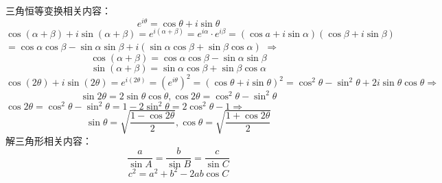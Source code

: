 三角恒等变换相关内容：
\begin{equation}
{e^{i\theta }} = \cos \theta  + i\sin \theta 
\end{equation}
$
\cos \left( {\alpha  + \beta } \right) + i\sin \left( {\alpha  + \beta } \right) = {e^{i\left( {\alpha  + \beta } \right)}} = {e^{i\alpha }} \cdot {e^{i\beta }} = \left( {\cos a + i\sin \alpha } \right)\left( {\cos \beta  + i\sin \beta } \right)
$
$= \cos \alpha \cos \beta  - \sin \alpha \sin \beta  + i\left( {\sin \alpha \cos \beta  + \sin \beta \cos \alpha } \right)
$
$\Rightarrow$
\begin{equation}
\cos \left( {\alpha  + \beta } \right) = \cos \alpha \cos \beta  - \sin \alpha \sin \beta
\end{equation}
\begin{equation}
\sin \left( {\alpha  + \beta } \right) = \sin \alpha \cos \beta  + \sin \beta \cos \alpha
\end{equation}
$
\cos \left( {2\theta } \right) + i\sin \left( {2\theta } \right) = {e^{i\left( {2\theta } \right)}} = {\left( {{e^{i\theta }}} \right)^2} = {\left( {\cos \theta  + i\sin \theta } \right)^2} = {\cos ^2}\theta  - {\sin ^2}\theta  + 2i\sin \theta \cos \theta \Rightarrow
$
\begin{equation}
\sin 2\theta  = 2\sin \theta \cos \theta ,\cos 2\theta  = {\cos ^2}\theta  - {\sin ^2}\theta
\end{equation}
$\cos 2\theta  = {\cos ^2}\theta  - {\sin ^2}\theta  = 1 - 2{\sin ^2}\theta  = 2{\cos ^2}\theta  - 1\Rightarrow$
\begin{equation}
\sin \theta  = \sqrt {\frac{{1 - \cos 2\theta }}{2}} ,\cos \theta  = \sqrt {\frac{{1 + \cos 2\theta }}{2}}
\end{equation}
解三角形相关内容：
\begin{equation}
\frac{a}{{\sin A}} = \frac{b}{{\sin B}} = \frac{c}{{\sin C}}
\end{equation}
\begin{equation}
{c^2} = {a^2} + {b^2} - 2ab\cos C
\end{equation}